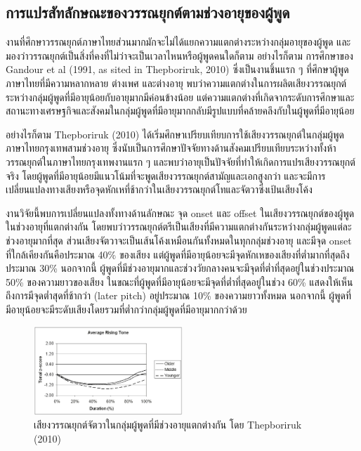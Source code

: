 \documentclass[a4paper]{article}
\begin{document}
\subsection{การแปรสัทลักษณะของวรรณยุกต์ตามช่วงอายุของผู้พูด}
    งานที่ศึกษาวรรณยุกต์ภาษาไทยส่วนมากมักจะไม่ได้แยกความแตกต่างระหว่างกลุ่มอายุของผู้พูด และมองว่าวรรณยุกต์เป็นสิ่งที่คงที่ไม่ว่าจะเป็นเวลาไหนหรือผู้พูดคนใดก็ตาม อย่างไรก็ตาม การศึกษาของ Gandour et al (1991, as sited in Thepboriruk, 2010) ซึ่งเป็นงานชิ้นแรก ๆ ที่ศึกษาผู้พูดภาษาไทยที่มีความหลากหลาย ต่างเพศ และต่างอายุ พบว่าความแตกต่างในการผลิตเสียงวรรณยุกต์ระหว่างกลุ่มผู้พูดที่มีอายุน้อยกับอายุมากมีค่อนข้างน้อย แต่ความแตกต่างที่เกิดจากระดับการศึกษาและสถานะทางเศรษฐกิจและสังคมในกลุ่มผู้พูดที่มีอายุมากกลับมีรูปแบบที่คล้ายคลึงกับในผู้พูดที่มีอายุน้อย

    อย่างไรก็ตาม Thepboriruk (2010) ได้เริ่มศึกษาเปรียบเทียบการใช้เสียงวรรณยุกต์ในกลุ่มผู้พูดภาษาไทยกรุงเทพสามช่วงอายุ ซึ่งนับเป็นการศึกษาปัจจัยทางด้านสังคมเปรียบเทียบระหว่างทั้งห้าวรรณยุกต์ในภาษาไทยกรุงเทพงานแรก ๆ และพบว่าอายุเป็นปัจจัยที่ทำให้เกิดการแปรเสียงวรรณยุกต์จริง โดยผู้พูดที่มีอายุน้อยมีแนวโน้มที่จะพูดเสียงวรรณยุกต์สามัญและเอกสูงกว่า และจะมีการเปลี่ยนแปลงทางเสียงหรือจุดหักเหที่ช้ากว่าในเสียงวรรณยุกต์โทและจัตวาซึ่งเป้นเสียงโค้ง

    งานวิจัยนี้พบการเปลี่ยนแปลงทั้งทางด้านลักษณะ จุด onset และ offset ในเสียงวรรณยุกต์ของผู้พูดในช่วงอายุที่แตกต่างกัน โดยพบว่าวรรณยุกต์ตรีเป็นเสียงที่มีความแตกต่างกันระหว่างกลุ่มผู้พูดแต่ละช่วงอายุมากที่สุด ส่วนเสียงจัตวาจะเป็นเส้นโค้งเหมือนกันทั้งหมดในทุกกลุ่มช่วงอายุ และมีจุด onset ที่ใกล้เคียงกันคือประมาณ 40\% ของเสียง แต่ผู้พูดที่มีอายุน้อยจะมีจุดหักเหของเสียงที่ต่ำมากที่สุดถึงประมาณ 30\% นอกจากนี้ ผู้พูดที่มีช่วงอายุมากและช่วงวัยกลางคนจะมีจุดที่ต่ำที่สุดอยู่ในช่วงประมาณ 50\% ของความยาวของเสียง ในขณะที่ผู้พูดที่มีอายุน้อยจะมีจุดที่ต่ำที่สุดอยู่ในช่วง 60\% แสดงให้เห็นถึงการมีจุดต่ำสุดที่ช้ากว่า (later pitch) อยู่ประมาณ 10\% ของความยาวทั้งหมด นอกจากนี้ ผู้พูดที่มีอายุน้อยจะมีระดับเสียงโดยรวมที่ต่ำกว่ากลุ่มผู้พูดที่มีอายุมากกว่าด้วย
    \begin{figure}[!ht]
        \begin{center}
        \includegraphics[width=0.5\textwidth]{thepboriruk}
        \end{center}
        \caption{เสียงวรรณยุกต์จัตวาในกลุ่มผู้พูดที่มีช่วงอายุแตกต่างกัน โดย Thepboriruk (2010)}
    \end{figure}
\end{document}
